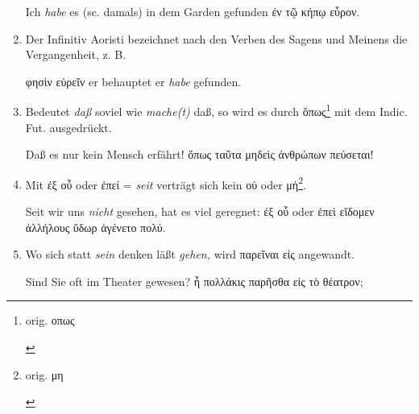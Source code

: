 \begin{enumerate}[leftmargin=0pt,rightmargin=0pt,listparindent =1cm,labelindent=1cm,labelsep=1ex,labelwidth={*},itemindent={*},align=left]
\begin{continuousexamples}
Ich \emph{habe} es (\textlatin{sc.} damals) in dem Garden gefunden
\textgreek[variant=ancient]{ἐν τῷ κήπῳ εὗρον. }\par\end{continuousexamples}

\item Der Infinitiv Aoristi bezeichnet nach den Verben des Sagens und Meinens
die Vergangenheit, z. B.


\begin{continuousexamples}\textgreek[variant=ancient]{φησὶν εὑρεῖν}
er behauptet er \emph{habe} gefunden.\par\end{continuousexamples}

\item Bedeutet \emph{daß} soviel wie \emph{mache(t)} daß, so wird es durch
\textgreek[variant=ancient]{ὅπως}\footnote{\begin{latin}%
orig. \textgreek[variant=ancient]{οπως}\end{latin}%
} mit dem \textlatin{Indic. Fut.} ausgedrückt.


\begin{continuousexamples}Daß es nur kein Mensch erfährt! \textgreek[variant=ancient]{ὅπως
ταῦτα μηδεὶς ἀνθρώπων πεύσεται!}\par\end{continuousexamples}

\item Mit \textgreek[variant=ancient]{ἐξ οὗ} oder \textgreek[variant=ancient]{ἐπεί}
= \emph{seit} verträgt sich kein \textgreek[variant=ancient]{οὐ} oder
\textgreek[variant=ancient]{μή}\footnote{\begin{latin}%
orig. \textgreek[variant=ancient]{μη}\end{latin}%
}\textgreek[variant=ancient]{.}


\begin{continuousexamples}Seit wir uns \emph{nicht} gesehen, hat
es viel geregnet: \textgreek[variant=ancient]{ἐξ οὗ }oder\textgreek[variant=ancient]{
ἐπεὶ εἴδομεν ἀλλήλους ὕδωρ ἀγένετο πολύ.}\par\end{continuousexamples}

\item Wo sich statt \emph{sein} denken läßt \emph{gehen,} wird \textgreek[variant=ancient]{παρεῖναι
εἰς} angewandt.


\begin{continuousexamples}Sind Sie oft im Theater gewesen? \textgreek[variant=ancient]{ἦ
πολλάκις παρῆσθα εἰς τὸ θέατρον;}\par\end{continuousexamples}


\end{enumerate}
